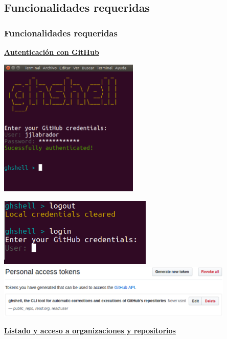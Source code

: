 \documentclass{beamer}
\begin{document}
\subsection{Funcionalidades requeridas}
\begin{frame}[allowframebreaks]
\frametitle{Funcionalidades requeridas}
  \bigskip
  
  \underline{{\bfseries Autenticación con GitHub}}
  \bigskip
  
  \begin{center}
     \includegraphics[width=0.5\textwidth]{images/ghshell2-1.eps}
  \end{center}
  \framebreak
  \begin{center}
  	\includegraphics[width=0.55\textwidth]{images/ghshell2-2.eps}
  	\newline
  	\newline
  	\includegraphics[width=0.85\textwidth]{images/ghshell2-3.eps}
  \end{center}
  
  \framebreak
  
  \underline{{\bfseries Listado y acceso a organizaciones y repositorios}}
  \bigskip
  

\end{frame}
\end{document}
